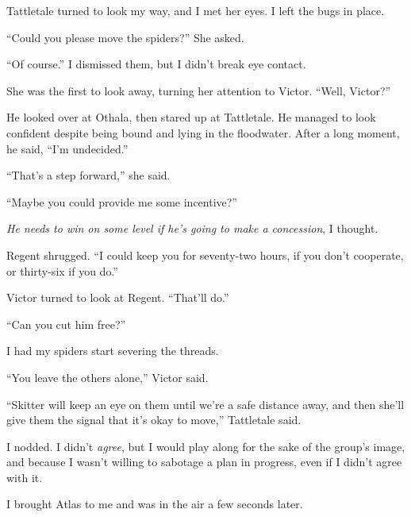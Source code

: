 Tattletale turned to look my way, and I met her eyes.  I left the bugs in place.



``Could you please move the spiders?''  She asked.



``Of course.''  I dismissed them, but I didn't break eye contact.



She was the first to look away, turning her attention to Victor.  ``Well, Victor?''



He looked over at Othala, then stared up at Tattletale.  He managed to look confident despite being bound and lying in the floodwater.  After a long moment, he said, ``I'm undecided.''



``That's a step forward,'' she said.



``Maybe you could provide me some incentive?''



\emph{He needs to win on some level if he's going to make a concession}, I thought.



Regent shrugged.  ``I could keep you for seventy-two hours, if you don't cooperate, or thirty-six if you do.''



Victor turned to look at Regent.  ``That'll do.''



``Can you cut him free?''



I had my spiders start severing the threads.



``You leave the others alone,'' Victor said.



``Skitter will keep an eye on them until we're a safe distance away, and then she'll give them the signal that it's okay to move,'' Tattletale said.



I nodded.  I didn't \emph{agree}, but I would play along for the sake of the group's image, and because I wasn't willing to sabotage a plan in progress, even if I didn't agree with it.



I brought Atlas to me and was in the air a few seconds later.



